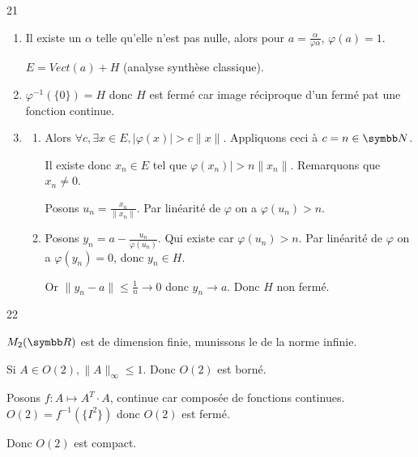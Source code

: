 \begin{correction}{21}
\begin{enumerate}
    \item Il existe un $\alpha$ telle qu'elle n'est pas nulle, alors pour $a = \frac {\alpha} {\varphi{\alpha}}$, $\varphi{(a)} =1$.

    $E = Vect(a) + H$ (analyse synthèse classique).

    \item $\varphi^{-1}{(\{0\})} = H$ donc $H$ est fermé car image réciproque d'un fermé pat une fonction continue.

    \item
    \begin{enumerate}
    \item Alors $\forall c, \exists x \in E, |\varphi(x)| > c\|x\|$.
        Appliquons ceci à $c = n \in \N$.
        
        Il existe donc $x_n \in E$ tel que $\varphi(x_n)| > n \|x_n\|$.
        Remarquons que $x_n \not = 0$.
        
        Posons $u_n = \frac {x_n} {\|x_n\|}$.
        Par linéarité de $\varphi$ on a $\varphi(u_n) > n$.

    \item Posons $y_n = a - \frac {u_n} {\varphi(u_n)}$. Qui existe car $\varphi(u_n) > n$.
        Par linéarité de $\varphi$ on a $\varphi(y_n) = 0$, donc $y_n \in H$.

        Or $\|y_n - a\| \leqslant \frac 1 n \to 0$ donc $y_n \to a$. Donc $H$ non fermé.
    \end{enumerate}
\end{enumerate}    
\end{correction}

\begin{correction}{22}

    $M_2(\R)$ est de dimension finie, munissons le de la norme infinie.

    Si $A \in O(2), \| A\|_{\infty} \leqslant 1$. Donc $O(2)$ est borné.

    Posons $f: A \mapsto A^T \cdot A$, continue car composée de fonctions continues.
    $O(2) = f^{-1}(\{I^2\})$ donc $O(2)$ est fermé.

    Donc $O(2)$ est compact.
\end{correction}


